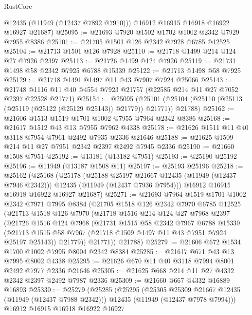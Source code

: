 \begin{lexlean}{RustCore}
\begin{coremodule}
        @12435
        (@11949 (@12437 @7892 @7910)))
      @16912
      @16915
      @16918
      @16922
      @16927
      @21687)
@25095 := @21693 @7920 @1502 @1702 @1002 @2342 @7929 @7955 @8386
@25101 := @21705 @1501 @126 @2342 @7928 @6785 @12525
@25104 := @21713 @1501 @126 @7928
@25110 := @21718 @1499 @214 @124 @27 @7926 @2397
@25113 := @21726 @1499 @124 @7926
@25119 := @21731 @1498 @58 @2342 @7925 @6788 @15339
@25122 := @21713 @1498 @58 @7925
@25129 := @21718 @1491 @1497 @11 @43 @7907 @7924 @25066
@25143 := @21748 @1116 @11 @40 @4554 @7923 @21757 (@22585 @214 @11 @27 @7052 @2397 @22528 @21771)
@25154 := @25095
    (@25101 (@25104 (@25110 (@25113 (@25119 (@25122 (@25129 @25143)) @21779)) @21771)) @21788)
@25162 := @21606 @1513 @1519 @1701 @1002 @7955 @7964 @2342 @8386
@25168 := @21617 @1512 @43 @13 @7955 @7962 @4338
@25178 := @21626 @1511 @11 @40 @3118 @7954 @7961 @2492 @7935 @2336 @21646
@25188 := @21625 @1509 @214 @11 @27 @7951 @2342 @2397 @2492 @7945 @2336
@25190 := @21660 @1508 @7951
@25192 := @13181 (@13182 @7951)
@25193 := @25190 @25192
@25196 := @11949 (@13187 @1508 @11)
@25197 := @25193 @25196
@25218 := @25162
    (@25168
      (@25178
        (@25188 @25197 @21667 @12435 (@11949 (@12437 @7946 @2342)))
        @12435
        (@11949 (@12437 @7936 @7954)))
      @16912
      @16915
      @16918
      @16922
      @16927
      @21687)
@25271 := @21693
    @7964
    @1519
    @1701
    @1002
    @2342
    @7971
    @7995
    @8384
    (@21705
      @1518
      @126
      @2342
      @7970
      @6785
      @12525
      (@21713
        @1518
        @126
        @7970
        (@21718
          @1516
          @214
          @124
          @27
          @7968
          @2397
          (@21726
            @1516
            @124
            @7968
            (@21731
              @1515
              @58
              @2342
              @7967
              @6788
              @15339
              (@21713 @1515 @58 @7967 (@21718 @1509 @1497 @11 @43 @7951 @7924 @25197 @25143))
              @21779))
          @21771))
      @21788)
@25279 := @21606 @672 @1534 @1700 @1002 @7995 @8004 @2342 @8384
@25285 := @21617 @671 @43 @13 @7995 @8002 @4338
@25295 := @21626 @670 @11 @40 @3118 @7994 @8001 @2492 @7977 @2336 @21646
@25305 := @21625 @668 @214 @11 @27 @4332 @2342 @2397 @2492 @7987 @2336
@25309 := @21660 @667 @4332 @16889 @16893
@25330 := @25279
    (@25285
      (@25295
        (@25305 @25309 @21667 @12435 (@11949 (@12437 @7988 @2342)))
        @12435
        (@11949 (@12437 @7978 @7994)))
      @16912
      @16915
      @16918
      @16922
      @16927

\end{coremodule}
\end{lexlean}
